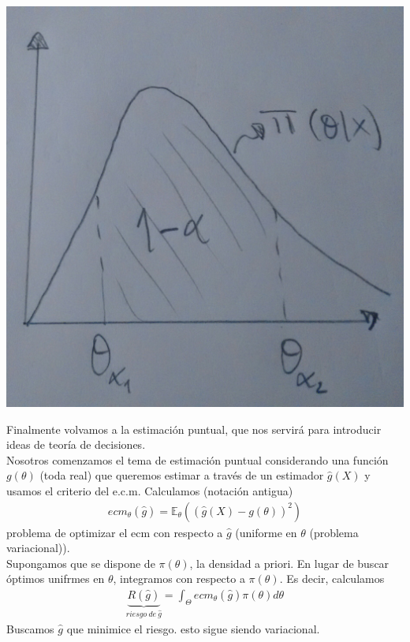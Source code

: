 \documentclass[10pt]{article}
\theoremstyle{plain}
\theoremstyle{definition}
\begin{document}
\begin{etaremune}
\begin{center}
\includegraphics[scale=0.1]{imagenes/credibilidad.jpg}
\end{center}
\item Finalmente volvamos a la estimación puntual, que nos servirá para introducir ideas de teoría de decisiones.\\

Nosotros comenzamos el tema de estimación puntual considerando una función $g(\theta)$ (toda real) que queremos estimar a través de un estimador $\hat{g}(X)$ y usamos el criterio del e.c.m. Calculamos (notación  antigua)
\begin{align*}
ecm_{\theta}(\hat{g}) = \mathbb{E}_{\theta}((\hat{g}(X)-g(\theta))^2)
\end{align*}
problema de optimizar el ecm con respecto a $\hat{g}$ (uniforme en $\theta$ (problema variacional)).\\

Supongamos que se dispone de $\pi(\theta)$, la densidad a priori. En lugar de buscar óptimos unifrmes en $\theta$, integramos con respecto a $\pi(\theta)$. Es decir, calculamos
\begin{align*}
\underbrace{R(\hat{g})}_{riesgo\ de\ \hat{g}} = \int_{\Theta}ecm_{\theta}(\hat{g})\pi(\theta)d\theta
\end{align*}
Buscamos $\hat{g}$ que minimice el riesgo. esto sigue siendo variacional.\\


\end{etaremune}
\end{document}
